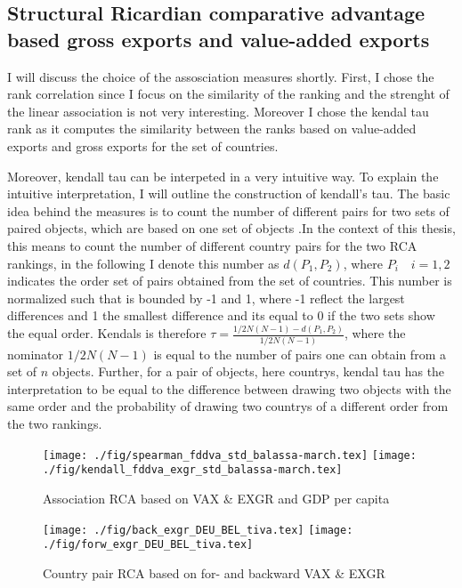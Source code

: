\subsection{Structural Ricardian comparative advantage based gross exports and value-added exports}
I will discuss the choice of the assosciation measures shortly. First, I chose the rank correlation since I focus on the similarity of the ranking and the strenght of the linear association is not very interesting. Moreover I chose the kendal tau rank as it computes the similarity between the ranks based on value-added exports and gross exports for the set of countries. \par 
Moreover, kendall tau can be interpeted in a very intuitive way. To explain the intuitive interpretation, I will outline the construction of kendall's tau. The basic idea behind the measures is to count the number of different pairs for two sets of paired objects, which are based on one set of objects  \textcite{abdi2007kendall}.In the context of this thesis, this means to count the number of different country pairs for the two RCA rankings, in the following I denote this  number as $d(P_1, P_2)$, where $P_i \quad i=1,2$ indicates the order set of pairs obtained from the set of  countries. This number is normalized such that is bounded by -1 and 1, where -1 reflect the largest differences and 1 the smallest difference and its equal to 0 if the two sets show the equal order. Kendals is therefore $\tau= \frac{1/2 N(N-1) - d(P_1,P_2)} {1/2 N(N-1)}$, where the nominator $1/2 N(N-1)$ is equal to the number of pairs one can obtain from a set of $n$ objects. Further, for a pair of objects, here countrys, kendal tau has the interpretation to be equal to the difference between drawing two objects with the same order and the probability of drawing two countrys of a different order from the two rankings.
\begin{figure}
\caption{Association RCA based on VAX \& EXGR and GDP per capita }
\centering
\texttt{[image: ./fig/spearman\_fddva\_std\_balassa-march.tex]}
\texttt{[image: ./fig/kendall\_fddva\_exgr\_std\_balassa-march.tex]}
\end{figure}

\begin{figure}
\caption{Country pair RCA based on for- and backward  VAX \& EXGR }
\texttt{[image: ./fig/back\_exgr\_DEU\_BEL\_tiva.tex]}
\texttt{[image: ./fig/forw\_exgr\_DEU\_BEL\_tiva.tex]}
\end{figure}

\endinput